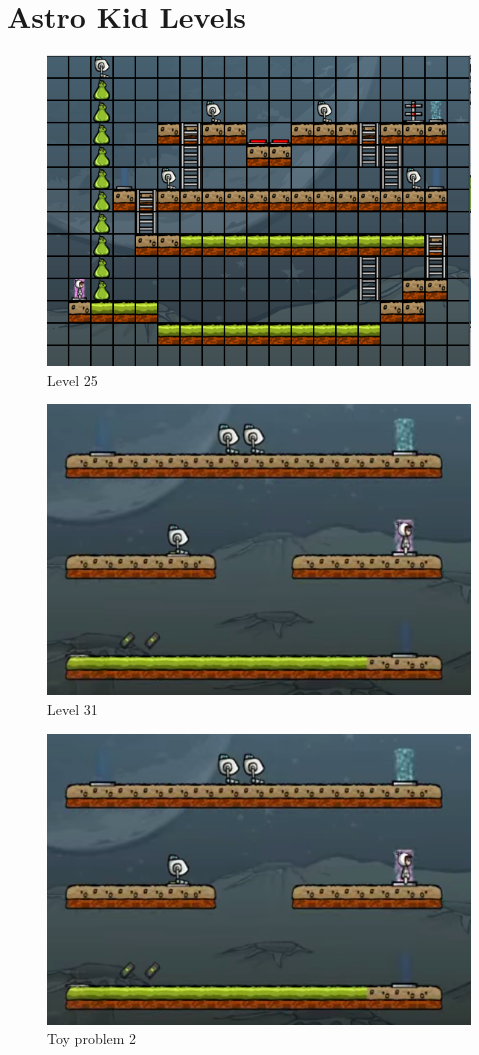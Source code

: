 \section{Astro Kid Levels}
\begin{figure}
	\centering
	
	\caption{Level 25}
	\label{level25}
	
	\includegraphics[width=1.0\textwidth]{appendix/img/lvl25}
\end{figure}
\begin{figure}
	\centering
	\caption{Level 31}
	\label{level31}
		
	\includegraphics[width=1.0\textwidth]{appendix/img/lvl31}
\end{figure}
\begin{figure}
	\centering
	\caption{Toy problem 2}
	\label{prob02}
	
	\includegraphics[width=1.0\textwidth]{appendix/img/lvl31}
\end{figure}